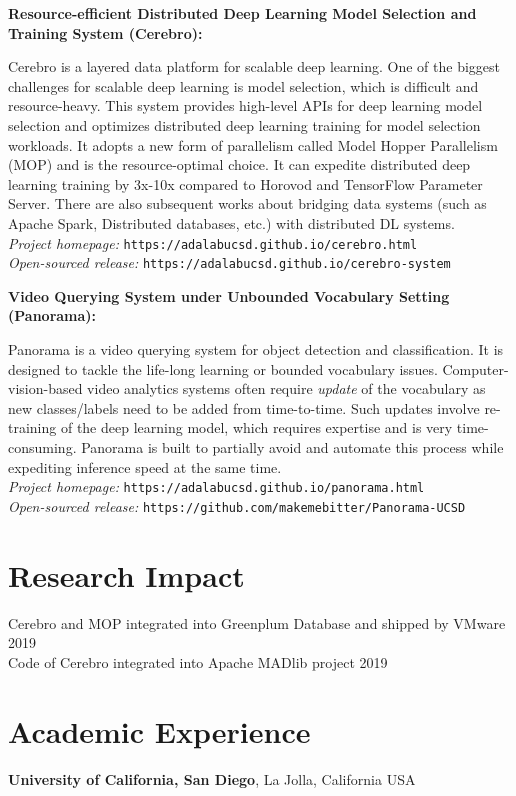 \documentclass[margin,line]{res}
\begin{document}
\begin{resume}
{\bf Resource-efficient Distributed Deep Learning Model Selection and Training System (Cerebro):}

Cerebro is a layered data platform for scalable deep learning. One of the biggest challenges for scalable deep learning is model selection, which is difficult and resource-heavy. This system provides high-level APIs for deep learning model selection and optimizes distributed deep learning training for model selection workloads. It adopts a new form of parallelism called Model Hopper Parallelism (MOP) and is the resource-optimal choice. It can expedite distributed deep learning training by 3x-10x compared to Horovod and TensorFlow Parameter Server. There are also subsequent works about bridging data systems (such as Apache Spark, Distributed databases, etc.) with distributed DL systems.\\
\textit{Project homepage: }\texttt{https://adalabucsd.github.io/cerebro.html}\\
\textit{Open-sourced release: }\texttt{https://adalabucsd.github.io/cerebro-system}

{\bf Video Querying System under Unbounded Vocabulary Setting (Panorama):}

Panorama is a video querying system for object detection and classification. It is designed to tackle the life-long learning or bounded vocabulary issues. Computer-vision-based video analytics systems often require \textit{update} of the vocabulary as new classes/labels need to be added from time-to-time. Such updates involve re-training of the deep learning model, which requires expertise and is very time-consuming. Panorama is built to partially avoid and automate this process while expediting inference speed at the same time.\\
\textit{Project homepage: }\texttt{https://adalabucsd.github.io/panorama.html}\\
\textit{Open-sourced release: }\texttt{https://github.com/makemebitter/Panorama-UCSD}

\section{\sc Research Impact}
Cerebro and MOP integrated into Greenplum Database and shipped by VMware \hfill 2019\\
Code of Cerebro integrated into Apache MADlib project \hfill 2019\\

\section{\sc Academic Experience}
{\bf University of California, San Diego}, La Jolla, California USA


\end{resume}
\end{document}
